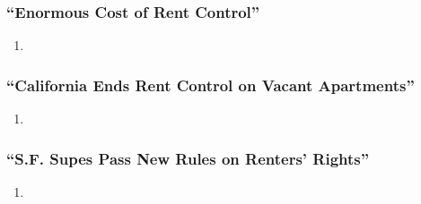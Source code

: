 \subsubsection{``Enormous Cost of Rent Control''}

\begin{enumerate}
    \item 
\end{enumerate}

\subsubsection{``California Ends Rent Control on Vacant Apartments''}

\begin{enumerate}
    \item 
\end{enumerate}

\subsubsection{``S.F. Supes Pass New Rules on Renters' Rights''}

\begin{enumerate}
    \item 
\end{enumerate}
